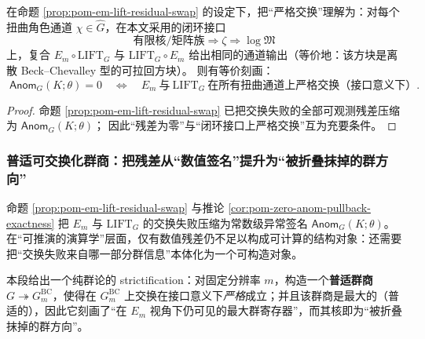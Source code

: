 \begin{corollary}\label{cor:pom-zero-anom-pullback-exactness}
在命题 \ref{prop:pom-em-lift-residual-swap} 的设定下，把“严格交换”理解为：对每个扭曲角色通道 \(\chi\in\widehat G\)，在本文采用的闭环接口
\[
\text{有限核/矩阵族}\Rightarrow \zeta \Rightarrow \log\mathfrak{M}
\]
上，复合 \(E_m\circ \mathrm{LIFT}_G\) 与 \(\mathrm{LIFT}_G\circ E_m\) 给出相同的通道输出（等价地：该方块是离散 Beck--Chevalley 型的可拉回方块）。
则有等价刻画：
\[
\boxed{\;
\mathsf{Anom}_G(K;\theta)=0
\quad\Longleftrightarrow\quad
E_m\ \text{与}\ \mathrm{LIFT}_G\ \text{在所有扭曲通道上严格交换（接口意义下）}.}
\]
\end{corollary}

\begin{proof}
命题 \ref{prop:pom-em-lift-residual-swap} 已把交换失败的全部可观测残差压缩为 \(\mathsf{Anom}_G(K;\theta)\)；
因此“残差为零”与“闭环接口上严格交换”互为充要条件。
\end{proof}

\subsubsection{普适可交换化群商：把残差从“数值签名”提升为“被折叠抹掉的群方向”}\label{subsec:pom-bc-quotient}
命题 \ref{prop:pom-em-lift-residual-swap} 与推论 \ref{cor:pom-zero-anom-pullback-exactness} 把 \(E_m\) 与 \(\mathrm{LIFT}_G\) 的交换失败压缩为常数级异常签名 \(\mathsf{Anom}_G(K;\theta)\)。
在“可推演的演算学”层面，仅有数值残差仍不足以构成可计算的结构对象：还需要把“交换失败来自哪一部分群信息”本体化为一个可构造对象。
\par
本段给出一个纯群论的 strictification：对固定分辨率 \(m\)，构造一个\textbf{普适群商} \(G\twoheadrightarrow G^{\mathrm{BC}}_m\)，使得在 \(G^{\mathrm{BC}}_m\) 上交换在接口意义下\emph{严格}成立；并且该群商是最大的（普适的），因此它刻画了“在 \(E_m\) 视角下仍可见的最大群寄存器”，而其核即为“被折叠抹掉的群方向”。

